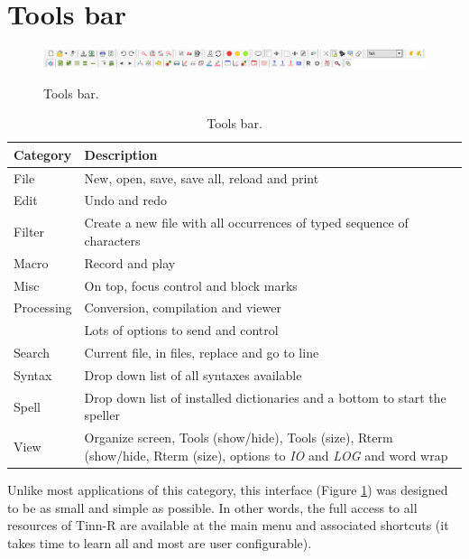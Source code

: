 
\hypertarget{working_toolsbar}{}
\section{Tools bar}

\begin{figure}[H]
  \includegraphics[scale=0.35]{./res/toolsbar.png}\\
  \caption{Tools bar.}
  \label{fig:toolsbar}
\end{figure}

\begin{table}[H]
  \begin{footnotesize}
    \begin{tabularx}{\textwidth}{>{\hsize=0.3\hsize}X>{\hsize=0.7\hsize}X}\\
      \hline
      \textbf{Category} & \textbf{Description} \\
      \hline
      File & New, open, save, save all, reload and print \\
      Edit & Undo and redo \\
      Filter & Create a new file with all occurrences of typed sequence of characters \\
      Macro & Record and play \\
      Misc & On top, focus control and block marks \\
      Processing & Conversion, compilation and viewer \\
      \RR{} & Lots of options to send and control \RR{} \\
      Search & Current file, in files, replace and go to line \\
      Syntax & Drop down list of all syntaxes available \\
      Spell & Drop down list of installed dictionaries and a bottom to start the speller \\
      View & Organize screen, Tools (show/hide), Tools (size), Rterm (show/hide, Rterm (size), options to \textit{IO} and \textit{LOG} and word wrap \\
      \hline
    \end{tabularx}
  \end{footnotesize}
  \caption{Tools bar.}
  \label{tab:toolsbar}
\end{table}

Unlike most applications of this category, this interface
(Figure \ref{fig:toolsbar})
was designed to be
as small and simple as possible. In other words, the full access to all
resources of Tinn-R are available at the main menu and associated shortcuts
(it takes time to learn all and most are user configurable).

